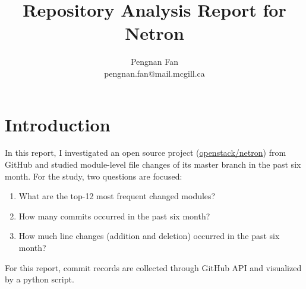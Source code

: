 \documentclass[11pt]{article}
\begin{document}
 
\title{Repository Analysis Report for Netron}
\author{Pengnan Fan \\ pengnan.fan@mail.mcgill.ca}

\maketitle

\section{Introduction}
In this report, I investigated an open source project (\href{https://github.com/openstack/neutron}{openstack/netron}) from GitHub and studied module-level file changes of its master branch in the past six month. For the study, two questions are focused:
\begin{enumerate}
    \item{
        What are the top-12 most frequent changed modules?
    }
    \item{
        How many commits occurred in the past six month?
    }
    \item{
        How much line changes (addition and deletion) occurred in the past six month? 
    }
\end{enumerate}
For this report, commit records are collected through GitHub API and visualized by a python script.
\end{document}
